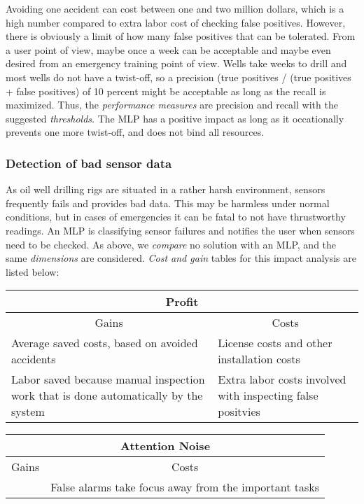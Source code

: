 \documentclass{article}
\begin{document}
Avoiding one accident can cost between one and two million dollars, which is a high number compared to extra labor cost of checking false positives. 
However, there is obviously a limit of how many false positives that can be tolerated. 
From a user point of view, maybe once a week can be acceptable and maybe even desired from an emergency training point of view. 
Wells take weeks to drill and most wells do not have a twist-off, so a precision (true positives / (true positives + false positives) of 10 percent might be acceptable as long as the recall is maximized. 
Thus, the \emph{performance measures} are precision and recall with the suggested \emph{thresholds}.
The MLP has a positive impact as long as it occationally prevents one more twist-off, and does not bind all resources.

\subsubsection{Detection of bad sensor data}
As oil well drilling rigs are situated in a rather harsh environment, sensors frequently fails and provides bad data. 
This may be harmless under normal conditions, but in cases of emergencies it can be fatal to not have thrustworthy readings. 
An MLP is classifying sensor failures and notifies the user when sensors need to be checked. 
As above, we \emph{compare} no solution with an MLP, and the same \emph{dimensions} are considered.
\emph{Cost and gain} tables for this impact analysis are listed below:

\vspace{1ex}
\begin{tabular}{|p{}|p{}|}
\hline
\multicolumn{2}{|c|}{Profit}\\
\hline
\multicolumn{1}{|c|}{Gains} & 
\multicolumn{1}{|c|}{Costs} \\
\hline
Average saved costs, based on avoided accidents &
License costs and other installation costs \\ 
\hline
Labor saved because manual inspection work that is done automatically by the system &
Extra labor costs involved with inspecting false positvies \\ 
\hline
\end{tabular}
\vspace{1ex}

\vspace{1ex}
\begin{tabular}{|p{}|p{}|}
\hline
\multicolumn{2}{|c|}{Attention Noise}\\
\hline
\multicolumn{1}{|c|}{Gains} & 
\multicolumn{1}{|c|}{Costs} \\
\hline
& False alarms take focus away from the important tasks \\ 
\hline
\end{tabular}
\vspace{1ex}
\end{document}
